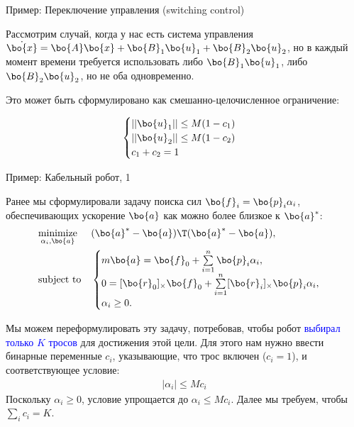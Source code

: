 \documentclass{beamer}
\begin{document}
	
	
	
	\begin{frame}{Пример: Переключение управления (switching control)}
		\begin{flushleft}
			
			Рассмотрим случай, когда у нас есть система управления $\dot{\bo{x}} =\bo{A}\bo{x} + \bo{B}_1\bo{u}_1 + \bo{B}_2\bo{u}_2$, но в каждый момент времени требуется использовать либо $\bo{B}_1\bo{u}_1$, либо $\bo{B}_2\bo{u}_2$, но не оба одновременно.
			
			\bigskip
			
			Это может быть сформулировано как смешанно-целочисленное ограничение:
			
			\begin{equation}
				\begin{cases}
					||\bo{u}_1|| \leq M (1 - c_1) \\
					||\bo{u}_2|| \leq M (1 - c_2) \\
					c_1 + c_2 = 1
				\end{cases}
			\end{equation}
			
		\end{flushleft}
	\end{frame}
	
	
	
	
	
	
	\begin{frame}{Пример: Кабельный робот, 1}
		\begin{flushleft}
			{\small
			Ранее мы сформулировали задачу поиска сил $\bo{f}_i  = \bo{p}_i \alpha_i$, обеспечивающих ускорение $\bo{a}$ как можно более близкое к $\bo{a}^*$:
			\begin{equation}
				\begin{aligned}
					& \underset{\alpha_i, \bo{a}}{\text{minimize}}
					& & (\bo{a}^* - \bo{a})\T (\bo{a}^* - \bo{a}), 
					\\
					& \text{subject to}
					& & \begin{cases}
						m \bo{a} = \bo{f}_0 + \sum\limits_{i = 1}^{n} \bo{p}_i \alpha_i,
						\\
						0 = [\bo{r}_0]_\times \bo{f}_0 + \sum\limits_{i = 1}^{n} [\bo{r}_i]_\times \bo{p}_i \alpha_i,
						\\
						\alpha_i \geq 0.
					\end{cases}
				\end{aligned}
			\end{equation}
			
			Мы можем переформулировать эту задачу, потребовав, чтобы робот \textcolor{blue}{выбирал только $K$ тросов} для достижения этой цели. Для этого нам нужно ввести бинарные переменные $c_i$, указывающие, что трос включен ($c_i = 1$), и соответствующее условие:
			\begin{align}
				| \alpha_i | \leq M c_i 
			\end{align}
			Поскольку $\alpha_i \geq 0$, условие упрощается до $\alpha_i \leq M c_i$. Далее мы требуем, чтобы $\sum\limits_i c_i = K$.}
			
		\end{flushleft}
	\end{frame}
	
\end{document}
